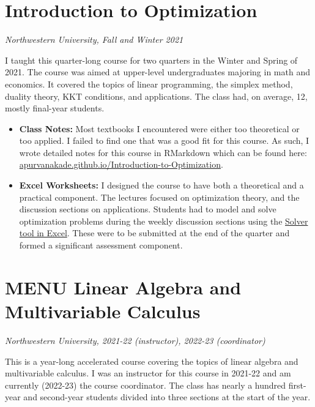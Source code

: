 \documentclass[
]{report}
\begin{document}
\hypertarget{introduction-to-optimization}{%
\section{Introduction to Optimization}\label{introduction-to-optimization}}

\emph{Northwestern University, Fall and Winter 2021}

I taught this quarter-long course for two quarters in the Winter and Spring of 2021.
The course was aimed at upper-level undergraduates majoring in math and economics.
It covered the topics of linear programming, the simplex method, duality theory, KKT conditions, and applications.
The class had, on average, 12, mostly final-year students.

\begin{itemize}
\item
  \textbf{Class Notes:}
  Most textbooks I encountered were either too theoretical or too applied.
  I failed to find one that was a good fit for this course.
  As such, I wrote detailed notes for this course in RMarkdown which can be found here: \href{https://apurvanakade.github.io/Introduction-to-Optimization/}{apurvanakade.github.io/Introduction-to-Optimization}.
\item
  \textbf{Excel Worksheets:}
  I designed the course to have both a theoretical and a practical component.
  The lectures focused on optimization theory, and the discussion sections on applications.
  Students had to model and solve optimization problems during the weekly discussion sections using the \href{https://support.microsoft.com/en-us/office/load-the-solver-add-in-in-excel-612926fc-d53b-46b4-872c-e24772f078ca}{Solver tool in Excel}.
  These were to be submitted at the end of the quarter and formed a significant assessment component.
\end{itemize}

\hypertarget{menu-linear-algebra-and-multivariable-calculus}{%
\section{MENU Linear Algebra and Multivariable Calculus}\label{menu-linear-algebra-and-multivariable-calculus}}

\emph{Northwestern University, 2021-22 (instructor), 2022-23 (coordinator)}

This is a year-long accelerated course covering the topics of linear algebra and multivariable calculus. I was an instructor for this course in 2021-22 and am currently (2022-23) the course coordinator. The class has nearly a hundred first-year and second-year students divided into three sections at the start of the year.
\end{document}
